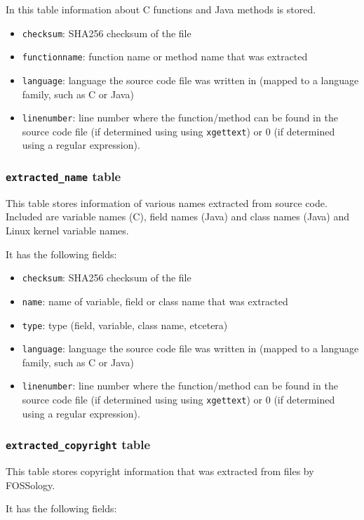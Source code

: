 \documentclass[10pt,a4paper]{article}
\begin{document}
In this table information about C functions and Java methods is stored.

\begin{itemize}
\item \texttt{checksum}: SHA256 checksum of the file
\item \texttt{functionname}: function name or method name that was extracted
\item \texttt{language}: language the source code file was written in (mapped
to a language family, such as C or Java)
\item \texttt{linenumber}: line number where the function/method can be found
in the source code file (if determined using using \texttt{xgettext}) or $0$
(if determined using a regular expression).
\end{itemize}

\subsubsection{\texttt{extracted\_name} table}
This table stores information of various names extracted from source code.
Included are variable names (C), field names (Java) and class names (Java) and
Linux kernel variable names.

It has the following fields:

\begin{itemize}
\item \texttt{checksum}: SHA256 checksum of the file
\item \texttt{name}: name of variable, field or class name that was extracted
\item \texttt{type}: type (field, variable, class name, etcetera)
\item \texttt{language}: language the source code file was written in (mapped
to a language family, such as C or Java)
\item \texttt{linenumber}: line number where the function/method can be found
in the source code file (if determined using using \texttt{xgettext}) or $0$
(if determined using a regular expression).
\end{itemize}

\subsubsection{\texttt{extracted\_copyright} table}
This table stores copyright information that was extracted from files by
FOSSology.

It has the following fields:
\end{document}
